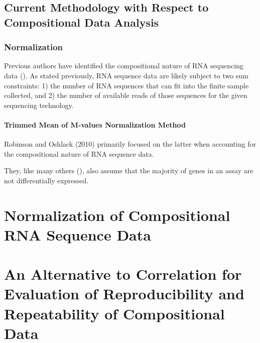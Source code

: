 \documentclass{book}\usepackage[]{graphicx}\usepackage[]{color}
\begin{document}
\section{Current Methodology with Respect to Compositional Data Analysis}
\subsection{Normalization}
Previous authors have identified the compositional nature of RNA sequencing data (\cite{Robinson2010}).  As stated previously, RNA sequence data are likely subject to two sum constraints: 1) the number of RNA sequences that can fit into the finite sample collected, and 2) the number of available reads of those sequences for the given sequencing technology.  

\subsubsection{Trimmed Mean of M-values Normalization Method}
Robinson and Oshlack (2010) primarily focused on the latter when accounting for the compositional nature of RNA sequence data.  

They, like many others (\cite{Anders2010}), also assume that the majority of genes in an assay are not differentially expressed.  



\chapter{Normalization of Compositional RNA Sequence Data}


\chapter[Correlaton]{An Alternative to Correlation for Evaluation of Reproducibility and Repeatability of Compositional Data}






\printbibliography
\end{document}
